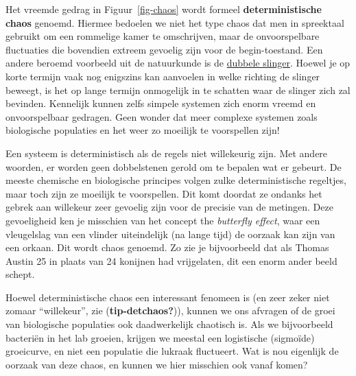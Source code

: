 \documentclass[
  a4paper,
]{scrbook}
\theoremstyle{definition}
\theoremstyle{remark}
\begin{document}
Het vreemde gedrag in Figuur~\ref{fig-chaos} wordt formeel
\textbf{deterministische chaos} genoemd. Hiermee bedoelen we niet het
type chaos dat men in spreektaal gebruikt om een rommelige kamer te
omschrijven, maar de onvoorspelbare fluctuaties die bovendien extreem
gevoelig zijn voor de begin-toestand. Een andere beroemd voorbeeld uit
de natuurkunde is de
\href{https://nl.wikipedia.org/wiki/Dubbele_slinger}{dubbele slinger}.
Hoewel je op korte termijn vaak nog enigszins kan aanvoelen in welke
richting de slinger beweegt, is het op lange termijn onmogelijk in te
schatten waar de slinger zich zal bevinden. Kennelijk kunnen zelfs
simpele systemen zich enorm vreemd en onvoorspelbaar gedragen. Geen
wonder dat meer complexe systemen zoals biologische populaties en het
weer zo moeilijk te voorspellen zijn!

\begin{tcolorbox}[enhanced jigsaw, coltitle=black, breakable, bottomtitle=1mm, opacityback=0, colback=white, rightrule=.15mm, title=\textcolor{quarto-callout-tip-color}{\faLightbulb}\hspace{0.5em}{Meer over ``deterministische chaos'' (verdieping)}, bottomrule=.15mm, toprule=.15mm, left=2mm, colframe=quarto-callout-tip-color-frame, toptitle=1mm, opacitybacktitle=0.6, titlerule=0mm, colbacktitle=quarto-callout-tip-color!10!white, leftrule=.75mm, arc=.35mm]

Een systeem is deterministisch als de regels niet willekeurig zijn. Met
andere woorden, er worden geen dobbelstenen gerold om te bepalen wat er
gebeurt. De meeste chemische en biologische principes volgen zulke
deterministische regeltjes, maar toch zijn ze moeilijk te voorspellen.
Dit komt doordat ze ondanks het gebrek aan willekeur zeer gevoelig zijn
voor de precisie van de metingen. Deze gevoeligheid ken je misschien van
het concept the \emph{butterfly effect}, waar een vleugelslag van een
vlinder uiteindelijk (na lange tijd) de oorzaak kan zijn van een orkaan.
Dit wordt chaos genoemd. Zo zie je bijvoorbeeld dat als Thomas Austin 25
in plaats van 24 konijnen had vrijgelaten, dit een enorm ander beeld
schept.

\end{tcolorbox}

Hoewel deterministische chaos een interessant fenomeen is (en zeer zeker
niet zomaar ``willekeur'', zie (\textbf{tip-detchaos?})), kunnen we ons
afvragen of de groei van biologische populaties ook daadwerkelijk
chaotisch is. Als we bijvoorbeeld bacteriën in het lab groeien, krijgen
we meestal een logistische (sigmoïde) groeicurve, en niet een populatie
die lukraak fluctueert. Wat is nou eigenlijk de oorzaak van deze chaos,
en kunnen we hier misschien ook vanaf komen?
\end{document}
